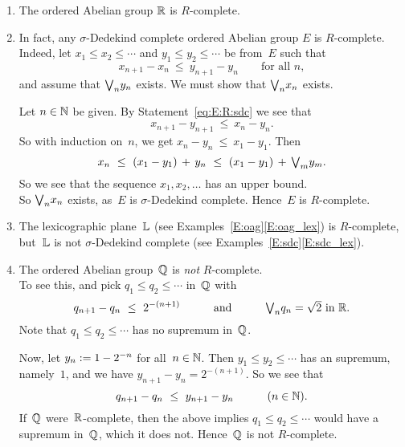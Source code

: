 \documentclass[main.tex]{subfiles}
\begin{document}
\begin{exs}
\begin{enumerate}
\item
The ordered Abelian group $\mathbb{R}$ is $R$-complete.

\item
In fact, any $\sigma$-Dedekind complete 
ordered Abelian group $E$ is $R$-complete.\\
Indeed,
let $x_1 \leq x_2 \leq \dotsb$ 
and $y_1 \leq y_2 \leq \dotsb$
be from~$E$
such that
\begin{equation}
\label{eq:E:R:sdc}
x_{n+1} - x_n \ \leq\ y_{n+1}-y_n
\qquad\text{for all }n,
\end{equation}
and assume that $\textstyle{\bigvee}_n y_n$ exists.
We must show that $\textstyle{\bigvee}_n x_n$ exists.

Let $n\in\mathbb{N}$ be given.
By Statement~\eqref{eq:E:R:sdc}
we see that
\begin{equation*}
x_{n+1} - y_{n+1} \ \leq\ x_n - y_n.
\end{equation*}
So with induction on~$n$, we get $x_n - y_n \ \leq\ x_1 - y_1$.
Then
\begin{equation*}
x_n \ \leq\ 
(x_1 - y_1) \,+\, y_n  \ \leq\ 
(x_1 - y_1) \,+\, \bv_m y_m.
\end{equation*}
So we see that the sequence $x_1,x_2,\dotsc$ 
has an upper bound.\\
So $\textstyle{\bigvee}_n x_n$ exists,
as~$E$ is $\sigma$-Dedekind complete.
Hence~$E$ is $R$-complete.


\item
The lexicographic plane~$\mathbb{L}$ (see Examples~\ref{E:oag}\ref{E:oag_lex})
is $R$-complete,
but~$\mathbb{L}$ is not $\sigma$-Dedekind complete
(see Examples~\ref{E:sdc}\ref{E:sdc_lex}).

\item
The ordered Abelian group~$\mathbb{Q}$ is \emph{not} $R$-complete.\\
To see this,
and pick $q_1 \leq q_2\leq \dotsb$ in~$\mathbb{Q}$
with
\begin{equation*}
q_{n+1} - q_{n} \ \leq\ 2^{-(n+1)}
\qquad\quad\text{and}\quad\qquad  \text{$\textstyle{\bigvee}_n q_n = \sqrt{2}$ in~$\mathbb{R}$.}
\end{equation*}
Note that $q_1\leq q_2 \leq \dotsb$
has no supremum in~$\mathbb{Q}$.

Now, let $y_n := 1-2^{-n}$ for all~$n\in\mathbb{N}$.
Then $y_1 \leq y_2 \leq \dotsb$ has an supremum, namely~$1$,
and we have $y_{n+1} - y_{n} = 2^{-(n+1)}$. So we see that
\begin{equation*}
q_{n+1} - q_{n} \ \leq\ y_{n+1} - y_n
\qquad\quad(n\in\N).
\end{equation*}
If~$\mathbb{Q}$ were~$\mathbb{R}$-complete,
then the above implies 
 $q_1 \leq q_2 \leq \dotsb$
would have a supremum in~$\mathbb{Q}$,
which it does not.
Hence~$\mathbb{Q}$ is not $R$-complete.
\end{enumerate}
\end{exs}
\end{document}

